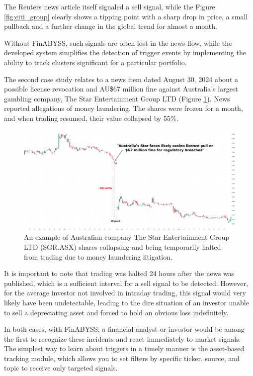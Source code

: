 The Reuters news article itself signaled a sell signal, while the Figure \ref{fig:citi_group} clearly shows
a tipping point with a sharp drop in price, a small pullback and a further change in the global trend for almost
a month.

Without FinABYSS, such signals are often lost in the news flow, while the developed system simplifies the detection
of trigger events by implementing the ability to track clusters significant for a particular portfolio.

The second case study relates to a news item dated August 30, 2024 about a possible license revocation and AU\$67
million fine against Australia's largest gambling company, The Star Entertainment Group LTD
(Figure \ref{fig:star_entertainment}). News reported allegations of money laundering. The shares were frozen
for a month, and when trading resumed, their value collapsed by 55\%.

\begin{figure}[H]
    \centering
    \includegraphics[width=1\linewidth]{img/star_entertainment.png}
    \caption{An example of Australian company The Star Entertainment Group LTD (SGR.ASX) shares
    collapsing and being temporarily halted from trading due to money laundering litigation.}
    \label{fig:star_entertainment}
\end{figure}

It is important to note that trading was halted 24 hours after the news was published, which is a sufficient
interval for a sell signal to be detected. However, for the average investor not involved in intraday trading,
this signal would very likely have been undetectable, leading to the dire situation of an investor unable to sell
a depreciating asset and forced to hold an obvious loss indefinitely.

In both cases, with FinABYSS, a financial analyst or investor would be among the first to recognize these incidents
and react immediately to market signals. The simplest way to learn about triggers in a timely manner is the asset-based
tracking module, which allows you to set filters by specific ticker, source, and topic to receive only targeted signals.

